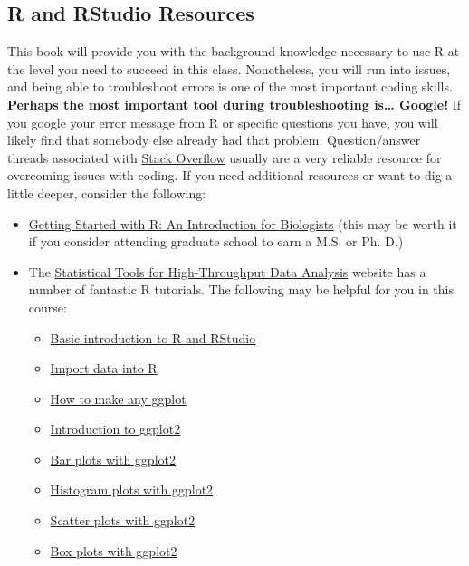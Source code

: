 \documentclass[
]{book}
\begin{document}
\hypertarget{r-and-rstudio-resources}{%
\subsection{R and RStudio Resources}\label{r-and-rstudio-resources}}

This book will provide you with the background knowledge necessary to use R at the level you need to succeed in this class. Nonetheless, you will run into issues, and being able to troubleshoot errors is one of the most important coding skills. \textbf{Perhaps the most important tool during troubleshooting is\ldots{} Google!} If you google your error message from R or specific questions you have, you will likely find that somebody else already had that problem. Question/answer threads associated with \href{https://stackoverflow.com/}{Stack Overflow} usually are a very reliable resource for overcoming issues with coding. If you need additional resources or want to dig a little deeper, consider the following:

\begin{itemize}
\item
  \href{https://www.oxfordscholarship.com/view/10.1093/acprof:oso/9780199601615.001.0001/acprof-9780199601615}{Getting Started with R: An Introduction for Biologists} (this may be worth it if you consider attending graduate school to earn a M.S. or Ph. D.)
\item
  The \href{http://www.sthda.com/english/}{Statistical Tools for High-Throughput Data Analysis} website has a number of fantastic R tutorials. The following may be helpful for you in this course:

  \begin{itemize}
  \item
    \href{http://www.sthda.com/english/wiki/r-basics-quick-and-easy}{Basic introduction to R and RStudio}
  \item
    \href{http://www.sthda.com/english/wiki/importing-data-into-r}{Import data into R}
  \item
    \href{http://r-statistics.co/ggplot2-Tutorial-With-R.html}{How to make any ggplot}
  \item
    \href{http://www.sthda.com/english/wiki/ggplot2-essentials}{Introduction to ggplot2}
  \item
    \href{http://www.sthda.com/english/wiki/ggplot2-barplots-quick-start-guide-r-software-and-data-visualization}{Bar plots with ggplot2}
  \item
    \href{http://www.sthda.com/english/wiki/ggplot2-histogram-plot-quick-start-guide-r-software-and-data-visualization}{Histogram plots with ggplot2}
  \item
    \href{http://www.sthda.com/english/wiki/ggplot2-scatter-plots-quick-start-guide-r-software-and-data-visualization}{Scatter plots with ggplot2}
  \item
    \href{http://www.sthda.com/english/wiki/ggplot2-box-plot-quick-start-guide-r-software-and-data-visualization}{Box plots with ggplot2}
  \end{itemize}
\end{itemize}
\end{document}
